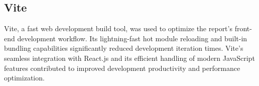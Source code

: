 \vspace{1cm}

\subsection*{Vite}

Vite, a fast web development build tool, was used to optimize the report's front-end development workflow. Its lightning-fast hot module reloading and built-in bundling capabilities significantly reduced development iteration times. Vite's seamless integration with React.js and its efficient handling of modern JavaScript features contributed to improved development productivity and performance optimization.
